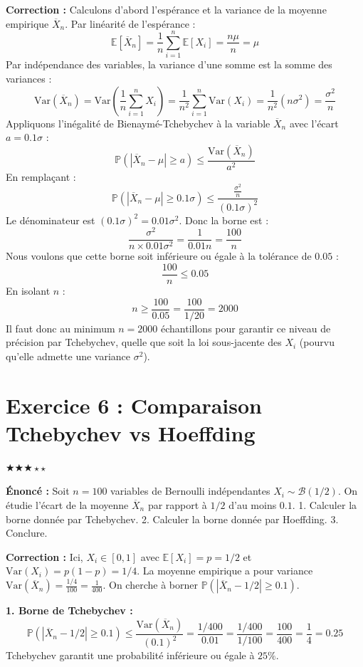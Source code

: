 \documentclass[11pt,a4paper]{article}
\begin{document}
\textbf{Correction :}
Calculons d'abord l'espérance et la variance de la moyenne empirique $\overline{X}_n$.
Par linéarité de l'espérance :
$$ \mathbb{E}[\overline{X}_n] = \frac{1}{n} \sum_{i=1}^n \mathbb{E}[X_i] = \frac{n\mu}{n} = \mu $$
Par indépendance des variables, la variance d'une somme est la somme des variances :
$$ \text{Var}(\overline{X}_n) = \text{Var}\left( \frac{1}{n} \sum_{i=1}^n X_i \right) = \frac{1}{n^2} \sum_{i=1}^n \text{Var}(X_i) = \frac{1}{n^2} (n \sigma^2) = \frac{\sigma^2}{n} $$
Appliquons l'inégalité de Bienaymé-Tchebychev à la variable $\overline{X}_n$ avec l'écart $a = 0.1\sigma$ :
$$ \mathbb{P}(|\overline{X}_n - \mu| \ge a) \le \frac{\text{Var}(\overline{X}_n)}{a^2} $$
En remplaçant :
$$ \mathbb{P}(|\overline{X}_n - \mu| \ge 0.1\sigma) \le \frac{\frac{\sigma^2}{n}}{(0.1\sigma)^2} $$
Le dénominateur est $(0.1\sigma)^2 = 0.01 \sigma^2$.
Donc la borne est :
$$ \frac{\sigma^2}{n \times 0.01 \sigma^2} = \frac{1}{0.01 n} = \frac{100}{n} $$
Nous voulons que cette borne soit inférieure ou égale à la tolérance de $0.05$ :
$$ \frac{100}{n} \le 0.05 $$
En isolant $n$ :
$$ n \ge \frac{100}{0.05} = \frac{100}{1/20} = 2000 $$
Il faut donc au minimum $n = 2000$ échantillons pour garantir ce niveau de précision par Tchebychev, quelle que soit la loi sous-jacente des $X_i$ (pourvu qu'elle admette une variance $\sigma^2$).


\section*{Exercice 6 : Comparaison Tchebychev vs Hoeffding}

$\bigstar\bigstar\bigstar\star\star$

\textbf{Énoncé :}
Soit $n = 100$ variables de Bernoulli indépendantes $X_i \sim \mathcal{B}(1/2)$. On étudie l'écart de la moyenne $\overline{X}_n$ par rapport à $1/2$ d'au moins $0.1$.
1. Calculer la borne donnée par Tchebychev.
2. Calculer la borne donnée par Hoeffding.
3. Conclure.

\textbf{Correction :}
Ici, $X_i \in [0, 1]$ avec $\mathbb{E}[X_i] = p = 1/2$ et $\text{Var}(X_i) = p(1-p) = 1/4$.
La moyenne empirique a pour variance $\text{Var}(\overline{X}_n) = \frac{1/4}{100} = \frac{1}{400}$.
On cherche à borner $\mathbb{P}(|\overline{X}_n - 1/2| \ge 0.1)$.

\textbf{1. Borne de Tchebychev :}
$$ \mathbb{P}(|\overline{X}_n - 1/2| \ge 0.1) \le \frac{\text{Var}(\overline{X}_n)}{(0.1)^2} = \frac{1/400}{0.01} = \frac{1/400}{1/100} = \frac{100}{400} = \frac{1}{4} = 0.25 $$
Tchebychev garantit une probabilité inférieure ou égale à $25\%$.
\end{document}
